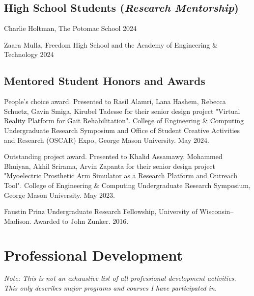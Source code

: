 \documentclass[letterpaper, 10pt]{article}
\begin{document}
\subsection{\textbf{High School Students} (\textit{Research Mentorship})}
\begin{compacthang}
     \item Charlie Holtman, The Potomac School \hfill 2024
     \item Zaara Mulla, Freedom High School and the Academy of Engineering \& Technology \hfill 2024
\end{compacthang}


\subsection{\textbf{Mentored Student Honors and Awards}}
\begin{compactitem}
     \item People's choice award. Presented to Rasil Alamri, Lana Hashem, Rebecca Schuetz, Gavin Smiga, Kirubel Tadesse for their senior design project "Virtual Reality Platform for Gait Rehabilitation". College of Engineering \& Computing Undergraduate Research Symposium and Office of Student Creative Activities and Research (OSCAR) Expo, George Mason University. May 2024.
	\item Outstanding project award. Presented to Khalid Assamawy, Mohammed Bhuiyan, Akhil Srirama, Arvin Zapanta for their senior design project "Myoelectric Prosthetic Arm Simulator as a Research Platform and Outreach Tool". College of Engineering \& Computing Undergraduate Research Symposium, George Mason University. May 2023. %
	\item Faustin Prinz Undergraduate Research Fellowship, University of Wisconsin--Madison. Awarded to John Zunker. 2016.
\end{compactitem}

\section{Professional Development}
\begin{itemize}
\end{itemize}
\end{document}
